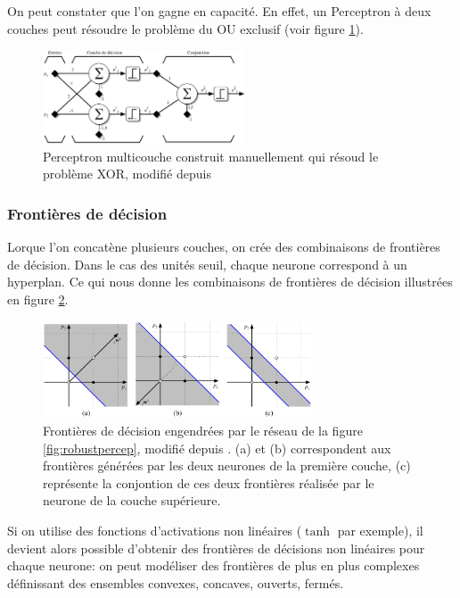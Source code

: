 On peut constater que l'on gagne en capacité. En effet, un Perceptron à deux
couches peut résoudre le problème du OU exclusif (voir figure
\ref{fig:solvexor}). 

\begin{figure}[!h]
\begin{center}
\includegraphics[width=6cm]{predoc/images/solvexor.eps}
\end{center}
\caption{\label{fig:solvexor} Perceptron multicouche construit manuellement qui résoud le problème XOR, modifié depuis \cite{parizeau}}
\end{figure}

\subsubsection{Frontières de décision}

Lorque l'on concatène plusieurs couches, on crée des combinaisons de frontières
de décision. Dans le cas des unités seuil, chaque neurone correspond à un
hyperplan. Ce qui nous donne les combinaisons de frontières de décision
illustrées en figure \ref{fig:frontieres}.

\begin{figure}[!h]
\begin{center}
\includegraphics[width=8cm]{predoc/images/frontieres.eps}
\end{center}
\caption{\label{fig:frontieres} Frontières de décision engendrées par le réseau de la figure \ref{fig:robustpercep}, modifié depuis \cite{parizeau}. (a) et (b) correspondent aux frontières générées par les deux neurones de la première couche, (c) représente la conjontion de ces deux frontières réalisée par le neurone de la couche supérieure.}
\end{figure}

Si on utilise des fonctions d'activations non linéaires ($\tanh$ par exemple),
il devient alors possible d'obtenir des frontières de décisions non linéaires
pour chaque neurone: on peut modéliser des frontières de plus en plus complexes
définissant des ensembles convexes, concaves, ouverts, fermés.

